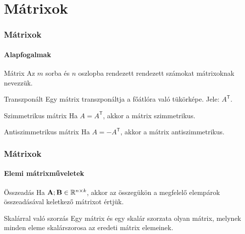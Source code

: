\documentclass[xcolor={table}]{beamer}
\begin{document}
\section{Mátrixok}
\begin{frame}
  \frametitle{Mátrixok}
  \framesubtitle{Alapfogalmak}

  \vfill

  \begin{block}{Mátrix}
    Az $m$ sorba és $n$ oszlopba rendezett rendezett számokat mátrixoknak
    nevezzük.
  \end{block}

  \vfill

  \begin{block}{Transzponált}
    Egy mátrix transzponáltja a főátlóra való tükörképe. Jele: $A^\mathsf T$.
  \end{block}

  \vfill

  \begin{block}{Szimmetrikus mátrix}
    Ha $A = A^\mathsf T$, akkor a mátrix szimmetrikus.
  \end{block}

  \vfill

  \begin{block}{Antiszimmetrikus mátrix}
    Ha $A = -A^\mathsf T$, akkor a mátrix antiszimmetrikus.
  \end{block}

  \vfill
\end{frame}

\begin{frame}
  \frametitle{Mátrixok}
  \framesubtitle{Elemi mátrixműveletek}

  \vfill

  \begin{block}{Összeadás}
    Ha $\mathbf{A}; \mathbf{B} \in \mathbb R^{n \times k}$, akkor az összegükön a
    megfelelő elempárok összeadásával keletkező mátrixot értjük.
  \end{block}

  \vfill

  \begin{block}{Skalárral való szorzás}
    Egy mátrix és egy skalár szorzata olyan mátrix, melynek minden eleme
    skalárszorosa az eredeti mátrix elemeinek.
  \end{block}

  \vfill
\end{frame}
\end{document}
